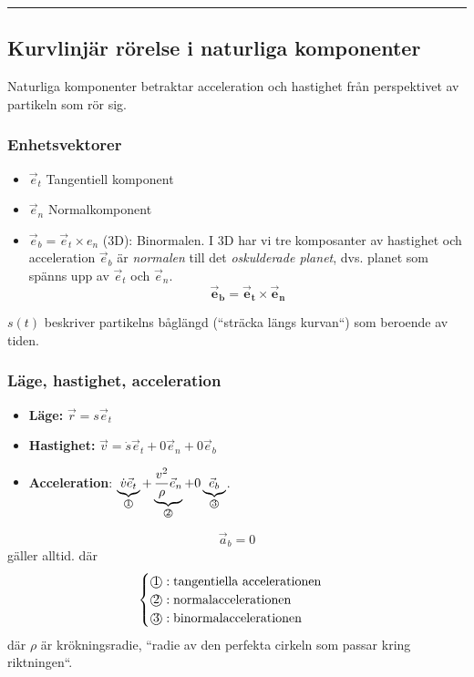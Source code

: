 \documentclass{article}
\newenvironment{ankiflashcard}[1]{}{}
\newcommand{\ruler}{
\rule{0.5\textwidth}{0.5pt}
}
\newcommand{\numbercircle}[1]{
\text{\textcircled{#1}}
}
\newcommand{\numbercirclewithunderbrace}[2]{
\underbrace{#1}_{\numbercircle{#2}}
}
\begin{document}
\begin{paracol}{2}
\ruler
\subsection{Kurvlinjär rörelse i naturliga komponenter}
Naturliga komponenter betraktar acceleration och hastighet från perspektivet av partikeln som rör sig.

\subsubsection{Enhetsvektorer}
\begin{itemize}
    \item $\vec e_t$ Tangentiell komponent
    \item  $\vec e_n$ Normalkomponent
    \item $\vec e_b=\vec e_t \times e_n$ (3D): Binormalen. I 3D har vi tre komposanter av hastighet och acceleration $\vec e_b$ är \textit{normalen} till det \textit{oskulderade planet}, dvs. planet som spänns upp av $\vec e_t$ och $\vec e_n$.
    $$\boxed{\mathbf{\vec e_b = \vec e_t \times \vec e_n}}$$
\end{itemize}
$s(t)$ beskriver partikelns båglängd (``sträcka längs kurvan``) som beroende av tiden.

\begin{ankiflashcard}{Ange ekvationer för läge, hastighet och acceleration i naturliga komponenter.}
    
\subsubsection{Läge, hastighet, acceleration}
\begin{itemize}
    \item \textbf{Läge:} $\vec r = s \vec e_t$
    \item \textbf{Hastighet:} $\vec v = \dot s \vec e_t+0 \vec e_n + 0 \vec e_b$
    \item \textbf{Acceleration}: $\numbercirclewithunderbrace{\dot v \vec e_t}{1} + \numbercirclewithunderbrace{\frac{v^2}{\rho} \vec e_n}{2} + 0\numbercirclewithunderbrace{\vec e_b}{3}$. 
\end{itemize}
$$\vec a_b = 0$$ gäller alltid.
där $$\begin{cases}
    \numbercircle{1}: \text{tangentiella accelerationen}\\
    \numbercircle{2}: \text{normalaccelerationen} \\
    \numbercircle{3}: \text{binormalaccelerationen} \\
\end{cases}$$
där $\rho$ är krökningsradie, ``radie av den perfekta cirkeln som passar kring riktningen``.
\end{ankiflashcard}


\end{paracol}
\end{document}

